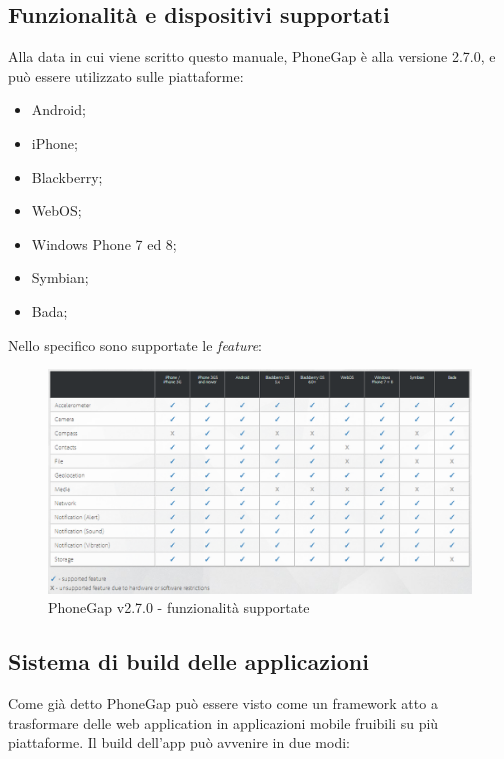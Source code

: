 \documentclass[10pt,a4paper,onecolumn]{article}
\begin{document}
\subsection{Funzionalità e dispositivi supportati}

	Alla data in cui viene scritto questo manuale, PhoneGap è alla versione 2.7.0, e può essere utilizzato sulle piattaforme:
	
\begin{itemize}
	\item Android;
	\item iPhone;
	\item Blackberry;
	\item WebOS;
	\item Windows Phone 7 ed 8;
	\item Symbian;
	\item Bada;
\end{itemize}

Nello specifico sono supportate le \textit{feature}:

\begin{figure}[h]
	\centering
	\includegraphics[width=1\textwidth]{img/Funzionalita}
	\caption{PhoneGap v2.7.0 - funzionalità supportate}						
	\label{fig:funzionalita}
\end{figure}

\subsection{Sistema di build delle applicazioni}

	Come già detto PhoneGap può essere visto come un framework atto a trasformare delle web application in applicazioni mobile fruibili su più piattaforme. Il build dell'app può avvenire in due modi:
	
\end{document}
